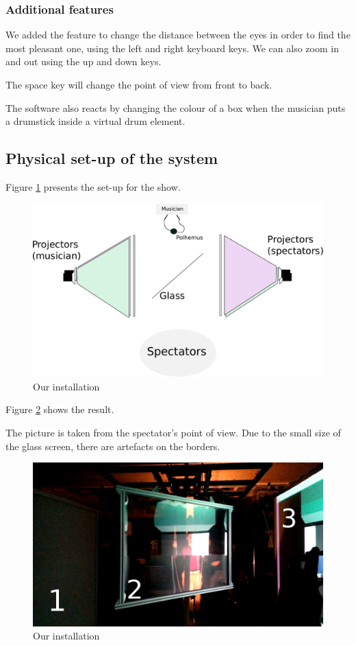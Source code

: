 \subsubsection{Additional features}
We added the feature to change the distance between the eyes in order to find the most pleasant one, using the left and right keyboard keys.
We can also zoom in and out using the up and down keys.

The space key will change the point of view from front to back.

The software also reacts by changing the colour of a box when the musician puts a drumstick inside a virtual drum element.

\subsection{Physical set-up of the system}
Figure \ref{fig:schemaPA} presents the set-up for the show.

\begin{figure}[h!]
\centering
\includegraphics[scale=0.8]{image/schemaPercu.pdf}
\caption{Our installation}
\label{fig:schemaPA}
\end{figure}

Figure \ref{fig:percuIRL} shows the result.

The picture is taken from the spectator's point of view. Due to the small size of the glass screen, there are artefacts on the borders. 

\begin{figure}[h!]
\centering
\includegraphics[scale=0.45]{image/percuIRL.jpg}
\caption{Our installation}
\label{fig:percuIRL}
\end{figure}